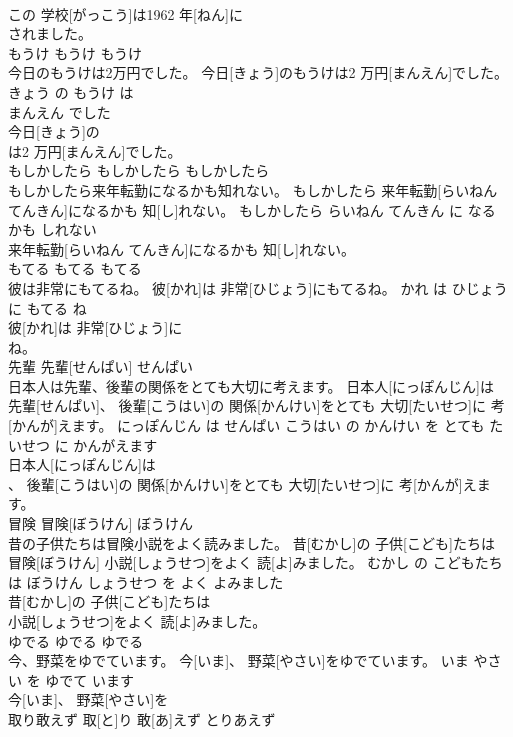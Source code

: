 \documentclass[8pt]{extreport}
\begin{document}
\begin{CJK}{UTF8}{min}
\\	この 学校[がっこう]は1962 年[ねん]に
\\	されました。			
\\	もうけ	もうけ	もうけ	
\\	今日のもうけは2万円でした。	今日[きょう]のもうけは2 万円[まんえん]でした。	きょう の もうけ は 
\\	まんえん でした	
\\	今日[きょう]の
\\	は2 万円[まんえん]でした。			
\\	もしかしたら	もしかしたら	もしかしたら	
\\	もしかしたら来年転勤になるかも知れない。	もしかしたら 来年転勤[らいねん てんきん]になるかも 知[し]れない。	もしかしたら らいねん てんきん に なる かも しれない	
\\	来年転勤[らいねん てんきん]になるかも 知[し]れない。			
\\	もてる	もてる	もてる	
\\	彼は非常にもてるね。	彼[かれ]は 非常[ひじょう]にもてるね。	かれ は ひじょう に もてる ね	
\\	彼[かれ]は 非常[ひじょう]に
\\	ね。			
\\	先輩	先輩[せんぱい]	せんぱい	
\\	日本人は先輩、後輩の関係をとても大切に考えます。	日本人[にっぽんじん]は 先輩[せんぱい]、 後輩[こうはい]の 関係[かんけい]をとても 大切[たいせつ]に 考[かんが]えます。	にっぽんじん は せんぱい こうはい の かんけい を とても たいせつ に かんがえます	
\\	日本人[にっぽんじん]は
\\	、 後輩[こうはい]の 関係[かんけい]をとても 大切[たいせつ]に 考[かんが]えます。			
\\	冒険	冒険[ぼうけん]	ぼうけん	
\\	昔の子供たちは冒険小説をよく読みました。	昔[むかし]の 子供[こども]たちは 冒険[ぼうけん] 小説[しょうせつ]をよく 読[よ]みました。	むかし の こどもたち は ぼうけん しょうせつ を よく よみました	
\\	昔[むかし]の 子供[こども]たちは
\\	小説[しょうせつ]をよく 読[よ]みました。			
\\	ゆでる	ゆでる	ゆでる	
\\	今、野菜をゆでています。	今[いま]、 野菜[やさい]をゆでています。	いま やさい を ゆでて います	
\\	今[いま]、 野菜[やさい]を
\\	取り敢えず	取[と]り 敢[あ]えず	とりあえず	

\end{CJK}
\end{document}
